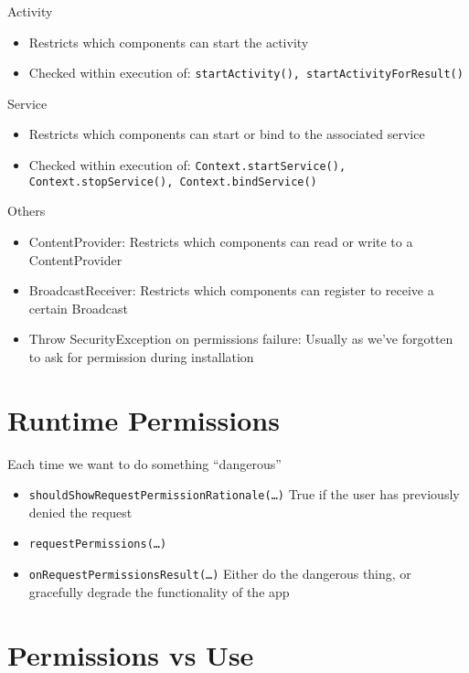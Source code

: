 \documentclass{article}
\begin{document}
\begin{flushleft}
Activity
\begin{itemize}
  \item Restricts which components can start the activity 
  \item Checked within execution of: \verb|startActivity(), startActivityForResult()|
\end{itemize}
Service
\begin{itemize}
  \item Restricts which components can start or bind to the associated service 
  \item Checked within execution of: \verb|Context.startService(), Context.stopService(), Context.bindService()|
\end{itemize}
Others
\begin{itemize}
  \item ContentProvider: Restricts which components can read or write to a ContentProvider
  \item BroadcastReceiver: Restricts which components can register to receive a certain Broadcast 
  \item Throw SecurityException on permissions failure: Usually as we’ve forgotten to ask for permission during installation
\end{itemize}
\end{flushleft}

\section{Runtime Permissions}

\begin{flushleft}
Each time we want to do something “dangerous”
\begin{itemize}
  \item \verb|shouldShowRequestPermissionRationale(…)| True if the user has previously denied the request
  \item \verb|requestPermissions(…)|
  \item \verb|onRequestPermissionsResult(…)| Either do the dangerous thing, or gracefully degrade the functionality of the app
\end{itemize}
\end{flushleft}

\section{Permissions vs Use}
\end{document}
